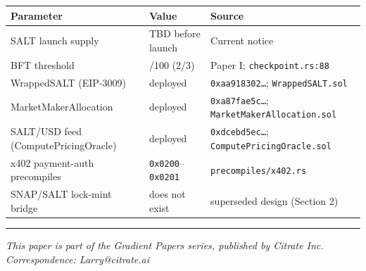 {\def\LTcaptype{none} %
\begin{longtable}[]{@{}
  >{\raggedright\arraybackslash}p{}
  >{\raggedright\arraybackslash}p{}
  >{\raggedright\arraybackslash}p{}@{}}
\toprule\noalign{}
\begin{minipage}[b]{\linewidth}\raggedright
Parameter
\end{minipage} & \begin{minipage}[b]{\linewidth}\raggedright
Value
\end{minipage} & \begin{minipage}[b]{\linewidth}\raggedright
Source
\end{minipage} \\
\midrule\noalign{}
\endhead
\bottomrule\noalign{}
\endlastfoot
SALT launch supply & TBD before launch & Current notice \\
BFT threshold & 67/100 (2/3) & Paper I; \texttt{checkpoint.rs:88} \\
WrappedSALT (EIP-3009) & deployed & \texttt{0xaa918302…};
\texttt{WrappedSALT.sol} \\
MarketMakerAllocation & deployed & \texttt{0xa87fae5c…};
\texttt{MarketMakerAllocation.sol} \\
SALT/USD feed (ComputePricingOracle) & deployed & \texttt{0xdcebd5ec…};
\texttt{ComputePricingOracle.sol} \\
x402 payment-auth precompiles & \texttt{0x0200}--\texttt{0x0201} &
\texttt{precompiles/x402.rs} \\
SNAP/SALT lock-mint bridge & does not exist & superseded design (Section
2) \\
\end{longtable}
}

\begin{center}\rule{0.5\linewidth}{0.5pt}\end{center}

\emph{This paper is part of the Gradient Papers series, published by
Citrate Inc.} \emph{Correspondence: Larry@citrate.ai}
